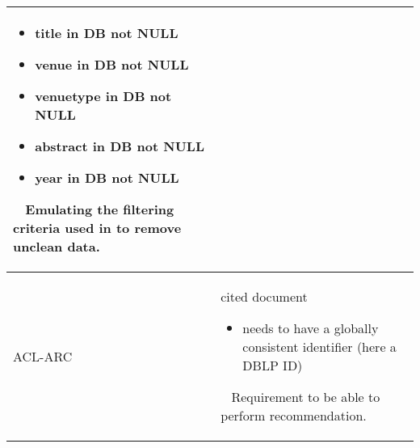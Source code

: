 \begin{table}[]
\begin{center}
\begin{tabular}{lp{11.5cm}}
            \begin{itemize}
                \item title in DB not NULL
                \item venue in DB not NULL
                \item venuetype in DB not NULL
                \item abstract in DB not NULL
                \item year in DB not NULL
            \end{itemize}
            \ 
            \newline
            Emulating the filtering criteria used in \cite{Ebesu2017} to remove unclean data.\\
    \midrule
    ACL-ARC & cited document
            \begin{itemize}
                \item needs to have a globally consistent identifier (here a DBLP ID)
            \end{itemize}
            \ 
            \newline
            Requirement to be able to perform recommendation.\\
    \bottomrule
    \end{tabular}
\end{center}
\end{table}
